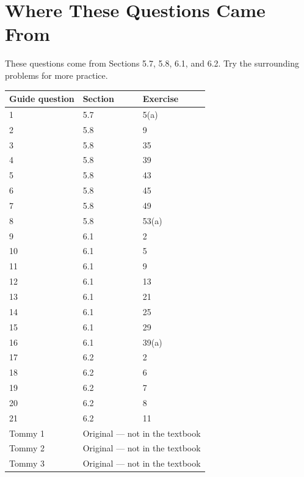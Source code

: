 \documentclass[11pt]{article}
\begin{document}
\section*{Where These Questions Came From}
These questions come from Sections 5.7, 5.8, 6.1, and 6.2. Try the surrounding problems for more practice.
\bigskip
\begin{center}
\begin{tabular}{lll}\toprule
Guide question & Section & Exercise\\\midrule
1 & 5.7 & 5(a)\\\midrule
2 & 5.8 & 9\\
3 & 5.8 & 35\\
4 & 5.8 & 39\\
5 & 5.8 & 43\\
6 & 5.8 & 45\\
7 & 5.8 & 49\\
8 & 5.8 & 53(a)\\\midrule
9 & 6.1 & 2\\
10 & 6.1 & 5\\
11 & 6.1 & 9\\
12 & 6.1 & 13\\
13 & 6.1 & 21\\
14 & 6.1 & 25\\
15 & 6.1 & 29\\
16 & 6.1 & 39(a)\\\midrule
17 & 6.2 & 2\\
18 & 6.2 & 6\\
19 & 6.2 & 7\\
20 & 6.2 & 8\\
21 & 6.2 & 11\\\midrule
Tommy 1 & \multicolumn{2}{l}{Original --- not in the textbook}\\
Tommy 2 & \multicolumn{2}{l}{Original --- not in the textbook}\\
Tommy 3 & \multicolumn{2}{l}{Original --- not in the textbook}\\\bottomrule
\end{tabular}
\end{center}
\end{document}
